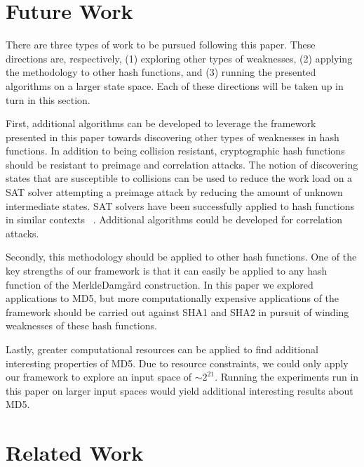 \section{Future Work}

There are three types of work to be pursued following this paper. These directions are, respectively, (1) exploring other types of weaknesses, (2) applying the methodology to other hash functions, and (3) running the presented algorithms on a larger state space. Each of these directions will be taken up in turn in this section. 

First, additional algorithms can be developed to leverage the framework presented in this paper towards discovering other types of weaknesses in hash functions. In addition to being collision resistant, cryptographic hash functions should be resistant to preimage and correlation attacks. The notion of discovering states that are susceptible to collisions can be used to reduce the work load on a SAT solver attempting a preimage attack by reducing the amount of unknown intermediate states. SAT solvers have been successfully applied to hash functions in similar contexts ~\cite{mironov2006applications}. Additional algorithms could be developed for correlation attacks. 

Secondly, this methodology should be applied to other hash functions. One of the key strengths of our framework is that it can easily be applied to any hash function of the Merkle{\textendash}Damg\r{a}rd construction. In this paper we explored applications to MD5, but more computationally expensive applications of the framework should be carried out against SHA1 and SHA2 in pursuit of winding weaknesses of these hash functions. 

Lastly, greater computational resources can be applied to find additional interesting properties of MD5. Due to resource constraints, we could only apply our framework to explore an input space of  $\sim 2^{21}$. Running the experiments run in this paper on larger input spaces would yield additional interesting results about MD5. 

\section*{Related Work}

